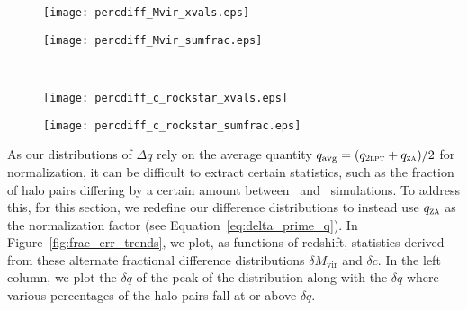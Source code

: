 \begin{figure*}[tp]
	\centering
	\begin{subfigure}{}
		\texttt{[image: percdiff\_Mvir\_xvals.eps]}
	\end{subfigure}
	\begin{subfigure}{}
		\texttt{[image: percdiff\_Mvir\_sumfrac.eps]}
	\end{subfigure}
	\\
	\begin{subfigure}{}
		\texttt{[image: percdiff\_c\_rockstar\_xvals.eps]}
	\end{subfigure}
	\begin{subfigure}{}
		\texttt{[image: percdiff\_c\_rockstar\_sumfrac.eps]}
	\end{subfigure}
	\caption[Statistics for distributions of $\delta q$ as functions of redshift]{\footnotesize Statistics for distributions of $\delta M_{\mathrm{vir}}$ (\textit{top row}) and $\delta c$ (\textit{bottom row}) as functions of redshift.  \textit{Left column}:  The $\delta q$ of the peak of the distribution (black curve), and the $\delta q$ where 50\% (red dashed curve), 10\% (green dashed curve), and 1\% (blue dashed curve) of the halos fall at or above $\delta q$.  As with distributions of $\Delta M_{\mathrm{vir}}$, $\delta M_{\mathrm{vir}}$ has the largest positive displacement at high redshift and steadily decreases throughout the simulation.  Additionally, $\delta c$ maintains a peak near zero and has a spread much larger than that of $\delta M_{\mathrm{vir}}$.  \textit{Right column}:  The fraction of halos with $\delta q$ greater than 0.10 (solid blue curve), 0.50 (solid green curve), 1.00 (solid red curve), and 4.00 (solid black curve).  The dashed curves additionally count halo pairs with $\delta q$ lower than the corresponding equivalent displacements of -0.09, -0.33, -0.50, and -0.80, respectively (see Equation~\ref{eq:equivalent_q_prime}).  We find that 50\% of \lpt\ halos are at least 10\% more massive than their \za\ companions at $z = 15$, reducing to 10\% by $z = 6$.  Halos in \lpt\ are at least twice as concentrated for 12\% of halos at $z = 15$ and 7.8\% of halos at $z = 6$.}
	\label{fig:frac_err_trends}
\end{figure*}

As our distributions of $\Delta q$ rely on the average quantity $q_{\mathrm{avg}} = (q_{\textsc{2lpt}} + q_{\textsc{za}}) / 2$ for normalization, it can be difficult to extract certain statistics, such as the fraction of halo pairs differing by a certain amount between \lpt\ and \za\ simulations.  To address this, for this section, we redefine our difference distributions to instead use $q_{\textsc{za}}$ as the normalization factor (see Equation~\ref{eq:delta_prime_q}).  In Figure~\ref{fig:frac_err_trends}, we plot, as functions of redshift, statistics derived from these alternate fractional difference distributions $\delta M_{\mathrm{vir}}$ and $\delta c$.  In the left column, we plot the $\delta q$ of the peak of the distribution along with the $\delta q$ where various percentages of the halo pairs fall at or above $\delta q$.

